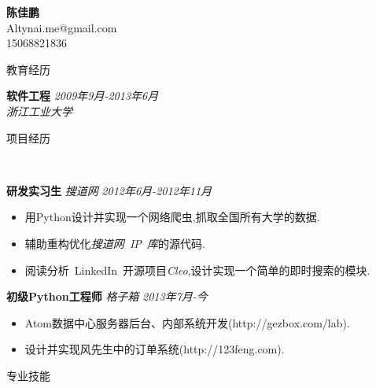 ﻿\documentclass[9pt]{article}
\newenvironment{changemargin}[2]{%
  \begin{list}{}{%
    \setlength{\topsep}{0pt}%
    \setlength{\leftmargin}{#1}%
    \setlength{\rightmargin}{#2}%
    \setlength{\listparindent}{\parindent}%
    \setlength{\itemindent}{\parindent}%
    \setlength{\parsep}{\parskip}%
  }%
  \item[]}{\end{list}
}
\newcommand{\lineover}{
	\begin{changemargin}{-0.05in}{-0.05in}
		\vspace*{-8pt}
		\hrulefill \\
		\vspace*{-2pt}
	\end{changemargin}
}
\newcommand{\header}[1]{
	\begin{changemargin}{-0.5in}{-0.5in}
		\scshape{#1}\\
  	\lineover
	\end{changemargin}
}
\newcommand{\contact}[4]{
	\begin{changemargin}{-0.5in}{-0.5in}
		\begin{center}
			{\Large \scshape \textbf{#1}}\\ \smallskip
			{#2}\\ \smallskip
			{#3}\\ \smallskip
			{#4}\smallskip
		\end{center}
	\end{changemargin}
}
\newenvironment{body} {
	\vspace*{-16pt}
	\begin{changemargin}{-0.25in}{-0.5in}
  }	
	{\end{changemargin}
}
\begin{document}
\contact{陈佳鹏}{Altynai.me@gmail.com}{15068821836}

\header{教育经历}
\begin{body}
	\vspace{14pt}
	\textbf{软件工程} \hfill \emph{2009年9月-2013年6月} \\
	\emph{浙江工业大学}\\
\end{body}

\smallskip

\header{项目经历}

\begin{body}
	\vspace{14pt}

	\textbf{研发实习生} \emph{搜道网} \hfill \emph{2012年6月-2012年11月}\\
	\vspace*{-4pt}
	\begin{itemize} \itemsep -0pt  %
		\item 用Python设计并实现一个网络爬虫,抓取全国所有大学的数据.
        \item 辅助重构优化\emph{搜道网~IP~库}的源代码.
        \item 阅读分析~LinkedIn~开源项目\emph{Cleo},设计实现一个简单的即时搜索的模块.
	\end{itemize}

    \textbf{初级Python工程师} \emph{格子箱} \hfill \emph{2013年7月-今}\\
    \vspace*{-4pt}
    \begin{itemize} \itemsep -0pt  %
        \item Atom数据中心服务器后台、内部系统开发(http://gezbox.com/lab).
        \item 设计并实现风先生中的订单系统(http://123feng.com).
    \end{itemize}

\end{body}

\smallskip


\header{专业技能}
\end{document}
